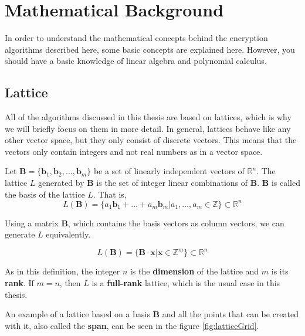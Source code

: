 \chapter{Mathematical Background}
\label{MathBack}

In order to understand the mathematical concepts behind the encryption algorithms described here, some basic concepts are explained here. However, you should have a basic knowledge of linear algebra and polynomial calculus.

\section{Lattice}


All of the algorithms discussed in this thesis are based on lattices, which is why we will briefly focus on them in more detail. In general, lattices behave like any other vector space, but they only consist of discrete vectors. This means that the vectors only contain integers and not real numbers as in a vector space.

Let $\textbf{B} = \{\textbf{b}_1, \textbf{b}_2, \ldots, \textbf{b}_m\}$ be a set of linearly independent vectors of $\mathbb{R}^n$. The lattice $\textit{L}$ generated by $\textbf{B}$ is the set of integer linear combinations of $\textbf{B}$. $\textbf{B}$ is called the basis of the lattice $\textit{L}$. That is,
$$L(\textbf{B}) = \{a_1\textbf{b}_1 + \ldots + a_m\textbf{b}_m | a_1, \ldots, a_m \in \mathbb{Z}  \} \subset \mathbb{R}^n$$


Using a matrix $\textbf{B}$, which contains the basis vectors as column vectors, we can generate $\textit{L}$ equivalently.

$$L(\textbf{B}) = \{\textbf{B}\cdot\textbf{x} | \textbf{x} \in \mathbb{Z}^m  \} \subset \mathbb{R}^n$$

As in this definition, the integer $n$ is the \textbf{dimension} of the lattice and $m$ is its \textbf{rank}. If $m = n$, then $\textit{L}$ is a \textbf{full-rank} lattice, which is the usual case in this thesis. 

An example of a lattice based on a basis $\textbf{B}$ and all the points that can be created with it, also called the \textbf{span}, can be seen in the figure \ref{fig:latticeGrid}.

